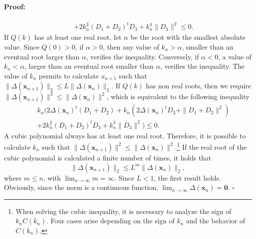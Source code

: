 \documentclass[preprint,11pt,authoryear]{elsarticle}
\newenvironment{proof}{\paragraph{Proof:}}{\hfill$\square$}
\begin{document}
\begin{proof}
\begin{eqnarray*}
&&+ 2 k_n^3 (D_1+D_2)^tD_3 +k_n^4 \|D_3\|^2 \le 0. 
\end{eqnarray*}
If $Q(k)$ has at least one real root, let $\alpha$ be the root with the smallest absolute value. Since $Q(0) >0$, if $\alpha >0$, then any value of $k_n> \alpha$, smaller than an eventual root larger than $\alpha$, verifies the inequality. Conversely, if $\alpha <0$, a value of $k_n <\alpha$, larger than an eventual root smaller than $\alpha$, verifies the inequality. The value of $k_n$ permits to calculate $x_{n+1}$ such that $\|\Delta (\mathbf{x}_{n+1}) \|_2\le L  \|\Delta (\mathbf{x}_n)\|_2$. 
\smallskip
If $Q(k)$ has non real roots, then we require $\|\Delta (\mathbf{x}_{n+1}) \|^2\le \|\Delta (\mathbf{x}_n)\|^2$, which is equivalent to the following inequality
 \begin{eqnarray*}
&&k_n( 2  \Delta (\mathbf{x}_n )^t (D_1+D_2)  + k_n(2\Delta (\mathbf{x}_n)^t D_3 + \|D_1+D_2\|^2) \\
&&+ 2 k_n^2 (D_1+D_2)^tD_3 +k_n^3 \|D_3\|^2 ) \le 0. 
\end{eqnarray*}
A cubic polynomial always has at least one real root. Therefore, it is possible to calculate $k_n$ such that $\|\Delta (\mathbf{x}_{n+1}) \|^2\le \|\Delta (\mathbf{x}_n)\|^2$.\footnote{When solving the cubic inequality, it is necessary to analyze the sign of $k_n C(k_n)$. Four cases arise depending on the sign of $k_n$ and the behavior of $C(k_n)$.} If the real root of the cubic polynomial is calculated a finite number of times, it holds that
$$ \|\Delta (\mathbf{x}_{n+1}) \|_2\le L^m\|\Delta (\mathbf{x}_n)\|_2,$$
where $m \le n$, with $\lim_{n\rightarrow \infty} m=\infty$. Since $L<1$, the first result holds. Obviously, since the norm is a continuous function, $\lim_{n\rightarrow \infty} \Delta(\mathbf{x}_n) = \mathbf{0}$.
\end{proof}
\end{document}
